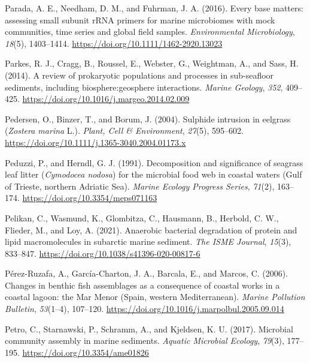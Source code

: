 \documentclass[
  12 pt,
]{book}
\newlength{\cslhangindent}
\newlength{\cslentryspacingunit} %
\newenvironment{CSLReferences}[2] %
 {%
  \setlength{\parindent}{0pt}
  \ifodd #1
  \let\oldpar\par
  \def\par{\hangindent=\cslhangindent\oldpar}
  \fi
  \setlength{\parskip}{#2\cslentryspacingunit}
 }%
 {}
\begin{document}
\begin{CSLReferences}{1}{0}
\leavevmode{}%
Parada, A. E., Needham, D. M., and Fuhrman, J. A. (2016). Every base matters: assessing small subunit {rRNA} primers for marine microbiomes with mock communities, time series and global field samples. \emph{Environmental Microbiology}, \emph{18}(5), 1403--1414. \url{https://doi.org/10.1111/1462-2920.13023}

\leavevmode{}%
Parkes, R. J., Cragg, B., Roussel, E., Webster, G., Weightman, A., and Sass, H. (2014). A review of prokaryotic populations and processes in sub-seafloor sediments, including biosphere:geosphere interactions. \emph{Marine Geology}, \emph{352}, 409--425. \url{https://doi.org/10.1016/j.margeo.2014.02.009}

\leavevmode{}%
Pedersen, O., Binzer, T., and Borum, J. (2004). Sulphide intrusion in eelgrass ({{{\emph{Zostera marina}}} L.)}. \emph{Plant, Cell \& Environment}, \emph{27}(5), 595--602. \url{https://doi.org/10.1111/j.1365-3040.2004.01173.x}

\leavevmode{}%
Peduzzi, P., and Herndl, G. J. (1991). Decomposition and significance of seagrass leaf litter ({{\emph{Cymodocea nodosa}}}) for the microbial food web in coastal waters ({Gulf} of {Trieste}, northern {Adriatic Sea}). \emph{Marine Ecology Progress Series}, \emph{71}(2), 163--174. \url{https://doi.org/10.3354/meps071163}

\leavevmode{}%
Pelikan, C., Wasmund, K., Glombitza, C., Hausmann, B., Herbold, C. W., Flieder, M., and Loy, A. (2021). Anaerobic bacterial degradation of protein and lipid macromolecules in subarctic marine sediment. \emph{The ISME Journal}, \emph{15}(3), 833--847. \url{https://doi.org/10.1038/s41396-020-00817-6}

\leavevmode{}%
Pérez-Ruzafa, A., García-Charton, J. A., Barcala, E., and Marcos, C. (2006). Changes in benthic fish assemblages as a consequence of coastal works in a coastal lagoon: the {Mar Menor} ({Spain}, western {Mediterranean}). \emph{Marine Pollution Bulletin}, \emph{53}(1--4), 107--120. \url{https://doi.org/10.1016/j.marpolbul.2005.09.014}

\leavevmode{}%
Petro, C., Starnawski, P., Schramm, A., and Kjeldsen, K. U. (2017). Microbial community assembly in marine sediments. \emph{Aquatic Microbial Ecology}, \emph{79}(3), 177--195. \url{https://doi.org/10.3354/ame01826}


\end{CSLReferences}
\end{document}
